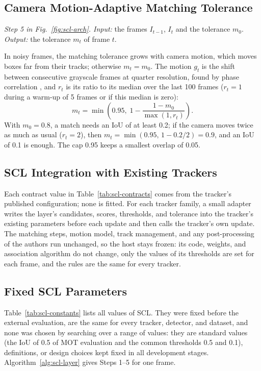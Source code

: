 \subsection{Camera Motion-Adaptive Matching Tolerance}\label{sec:scl-motion}
\emph{Step 5 in Fig.~\ref{fig:scl-arch}. Input:} the frames $I_{t-1}$, $I_t$ and the tolerance $m_0$. \emph{Output:} the tolerance $m_t$ of frame $t$.

In noisy frames, the matching tolerance grows with camera motion, which moves boxes far from their tracks; otherwise $m_t=m_0$. The motion $g_t$ is the shift between consecutive grayscale frames at quarter resolution, found by phase correlation \cite{tong2019fourier}, and $r_t$ is its ratio to its median over the last 100 frames ($r_t=1$ during a warm-up of 5 frames or if this median is zero):
\begin{equation}
m_t=\min\!\left(0.95,\;1-\frac{1-m_0}{\max(1,r_t)}\right).
\label{eq:scl-motion}
\end{equation}
With $m_0=0.8$, a match needs an IoU of at least 0.2; if the camera moves twice as much as usual ($r_t=2$), then $m_t=\min(0.95,\,1-0.2/2)=0.9$, and an IoU of 0.1 is enough. The cap 0.95 keeps a smallest overlap of 0.05.

\subsection{SCL Integration with Existing Trackers}\label{sec:scl-contract}
Each contract value in Table~\ref{tab:scl-contracts} comes from the tracker's published configuration; none is fitted. For each tracker family, a small adapter writes the layer's candidates, scores, thresholds, and tolerance into the tracker's existing parameters before each update and then calls the tracker's own update. The matching steps, motion model, track management, and any post-processing of the authors run unchanged, so the host stays frozen: its code, weights, and association algorithm do not change, only the values of its thresholds are set for each frame, and the rules are the same for every tracker.

\subsection{Fixed SCL Parameters}\label{sec:scl-constants}
Table~\ref{tab:scl-constants} lists all values of SCL. They were fixed before the external evaluation, are the same for every tracker, detector, and dataset, and none was chosen by searching over a range of values: they are standard values (the IoU of 0.5 of MOT evaluation and the common thresholds 0.5 and 0.1), definitions, or design choices kept fixed in all development stages. Algorithm~\ref{alg:scl-layer} gives Steps 1--5 for one frame.

